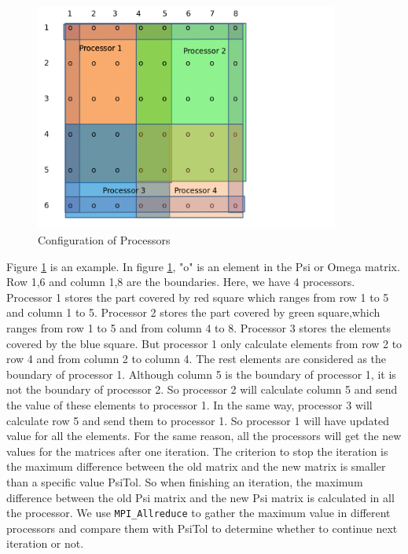\documentclass[twocolumn]{article}
\begin{document}
\begin{figure}[H]
\begin{center}
\includegraphics[width=10cm]{configuration.png}
\caption{Configuration of Processors}
\label{fig:configuration}
\end{center}
\end{figure}

Figure  \ref{fig:configuration} is an example.
In figure \ref{fig:configuration}, "o" is an element in the Psi or Omega matrix.
Row 1,6 and column 1,8 are the boundaries.
Here, we have 4 processors.
Processor 1 stores the part covered by red square
which ranges from row 1 to 5 and column 1 to 5.
Processor 2 stores the part covered by green square,which ranges from
row 1 to 5 and from column 4 to 8.
Processor 3 stores the elements covered by the blue square.
But processor 1 only calculate elements from row 2 to row 4 and from column
2 to column 4.
The rest elements are considered as the boundary of processor 1.
Although column 5 is the boundary of processor 1,  it is not the boundary
of processor 2.
So processor 2 will calculate column 5 and send the value of these elements
to processor 1. In the same way, processor 3 will calculate row 5 and send
them to processor 1.
So processor 1 will have updated value for all the elements.
For the same reason, all the processors will get the new values for the matrices
after one iteration.
The criterion to stop the iteration is the maximum difference between
the old matrix and the new matrix is smaller than a specific value PsiTol.
So when finishing an iteration, the maximum difference between the old Psi
matrix and the new Psi matrix is calculated in all the processor.
We use \texttt{MPI\_Allreduce} to gather the maximum value in different
processors and compare them with PsiTol to determine whether to continue
next iteration or not.
\end{document}
